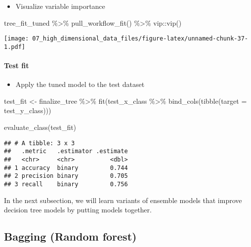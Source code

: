 \documentclass[
]{book}
\newenvironment{Shaded}{\begin{snugshade}}{\end{snugshade}}
\newcommand{\AttributeTok}[1]{\textcolor[rgb]{0.77,0.63,0.00}{#1}}
\newcommand{\FunctionTok}[1]{\textcolor[rgb]{0.00,0.00,0.00}{#1}}
\newcommand{\NormalTok}[1]{#1}
\newcommand{\OtherTok}[1]{\textcolor[rgb]{0.56,0.35,0.01}{#1}}
\newcommand{\SpecialCharTok}[1]{\textcolor[rgb]{0.00,0.00,0.00}{#1}}
\providecommand{\tightlist}{%
  \setlength{\itemsep}{0pt}\setlength{\parskip}{0pt}}
\begin{document}
\begin{itemize}
\tightlist
\item
  Visualize variable importance
\end{itemize}

\begin{Shaded}
\begin{Highlighting}[]
\NormalTok{tree\_fit\_tuned }\SpecialCharTok{\%\textgreater{}\%}
  \FunctionTok{pull\_workflow\_fit}\NormalTok{() }\SpecialCharTok{\%\textgreater{}\%}
\NormalTok{  vip}\SpecialCharTok{::}\FunctionTok{vip}\NormalTok{()}
\end{Highlighting}
\end{Shaded}

\texttt{[image: 07\_high\_dimensional\_data\_files/figure-latex/unnamed-chunk-37-1.pdf]}

\hypertarget{test-fit-1}{%
\paragraph{Test fit}\label{test-fit-1}}

\begin{itemize}
\tightlist
\item
  Apply the tuned model to the test dataset
\end{itemize}

\begin{Shaded}
\begin{Highlighting}[]
\NormalTok{test\_fit }\OtherTok{\textless{}{-}}\NormalTok{ finalize\_tree }\SpecialCharTok{\%\textgreater{}\%} 
  \FunctionTok{fit}\NormalTok{(test\_x\_class }\SpecialCharTok{\%\textgreater{}\%} \FunctionTok{bind\_cols}\NormalTok{(}\FunctionTok{tibble}\NormalTok{(}\AttributeTok{target =}\NormalTok{ test\_y\_class)))}

\FunctionTok{evaluate\_class}\NormalTok{(test\_fit)}
\end{Highlighting}
\end{Shaded}

\begin{verbatim}
## # A tibble: 3 x 3
##   .metric   .estimator .estimate
##   <chr>     <chr>          <dbl>
## 1 accuracy  binary         0.744
## 2 precision binary         0.705
## 3 recall    binary         0.756
\end{verbatim}

In the next subsection, we will learn variants of ensemble models that improve decision tree models by putting models together.

\hypertarget{bagging-random-forest}{%
\subsection{Bagging (Random forest)}\label{bagging-random-forest}}
\end{document}
